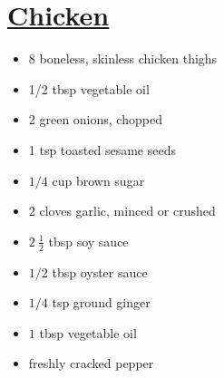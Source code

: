 \documentclass{article}
\begin{document}



\begin{minipage}{\textwidth}
\vspace{-1em}
\thispagestyle{firstpage}
\section*{\underline{Chicken}}
\ingredients
\vspace{-1em}
\begin{multicols*}{2}
\begin{minipage}{\linewidth}
\ingredients[Chicken]
\vspace{-1em}
\begin{itemize}
    \item 8 boneless, skinless chicken thighs
    \item 1/2 tbsp vegetable oil
\end{itemize}
\end{minipage}

\columnbreak
\begin{minipage}{\linewidth}
\ingredients[Garnish]
\vspace{-1em}
\begin{itemize}
    \item 2 green onions, chopped
    \item 1 tsp toasted sesame seeds
\end{itemize}
\end{minipage}
\end{multicols*}
\vspace{-1em}
\begin{multicols*}{2}
\begin{minipage}{\linewidth}
\ingredients[Marinade]
\vspace{-1em}
\begin{itemize}
    \item $1/4$ cup brown sugar
    \item $2$ cloves garlic, minced or crushed
    \item $2~\frac{1}{2}$ tbsp soy sauce
    \item $1/2$ tbsp oyster sauce
    \item $1/4$ tsp ground ginger
    \item $1$ tbsp vegetable oil
    \item freshly cracked pepper
\end{itemize}
\vspace{1em}
\end{minipage}


\end{multicols*}
\end{minipage}
\end{document}
